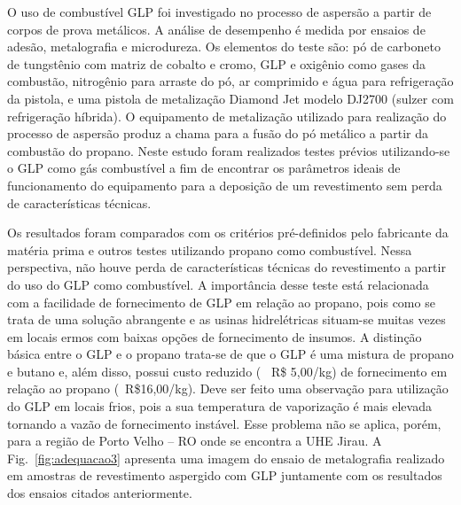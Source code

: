 O uso de combustível GLP foi investigado no processo de aspersão a partir de
corpos de prova metálicos. A análise de desempenho é medida por ensaios de
adesão, metalografia e microdureza. Os elementos do teste são: pó de carboneto
de tungstênio com matriz de cobalto e cromo, GLP e oxigênio como gases da combustão, nitrogênio para
arraste do pó, ar comprimido e água para refrigeração da pistola, e uma pistola
de metalização Diamond Jet modelo DJ2700 (sulzer com refrigeração híbrida). O
equipamento de metalização utilizado para realização do processo de aspersão
produz a chama para a fusão do pó metálico a partir da combustão do
propano. Neste estudo foram realizados testes prévios utilizando-se o GLP como
gás combustível a fim de encontrar os parâmetros ideais de funcionamento do
equipamento para a deposição de um revestimento sem perda de características
técnicas. 

Os resultados foram comparados com os critérios pré-definidos pelo fabricante
da matéria prima e outros testes utilizando propano como
combustível. Nessa perspectiva, não houve perda de características técnicas do
revestimento a partir do uso do GLP como combustível. A importância desse teste
está relacionada com a facilidade de fornecimento de GLP em relação ao propano,
pois como se trata de uma solução abrangente e as usinas hidrelétricas
situam-se muitas vezes em locais ermos com baixas opções de fornecimento de
insumos. A distinção básica entre o GLP e o propano trata-se de que o GLP é uma
mistura de propano e butano e, além disso, possui custo reduzido (~ R\$ 5,00/kg)
de fornecimento em relação ao propano (~R\$16,00/kg). Deve ser feito uma
observação para utilização do GLP em locais frios, pois a sua temperatura de
vaporização é mais elevada tornando a vazão de fornecimento instável. Esse
problema não se aplica, porém, para a região de Porto Velho – RO onde se
encontra a UHE Jirau. A Fig.~\ref{fig:adequacao3} apresenta uma imagem do
ensaio de metalografia realizado em amostras de revestimento aspergido com GLP juntamente
com os resultados dos ensaios citados anteriormente.

